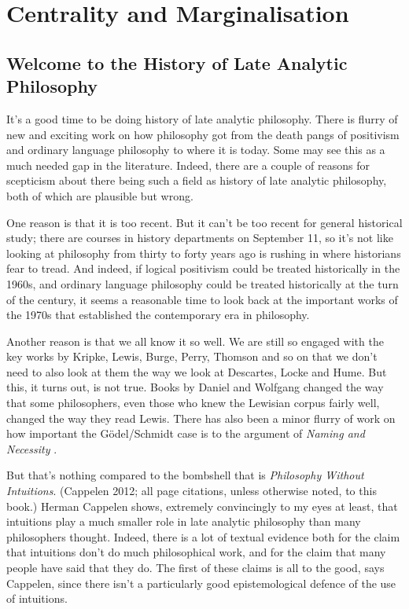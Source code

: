 \chapter[Centrality and Marginalisation]{Centrality and Marginalisation}
\section{Welcome to the History of Late Analytic Philosophy}
\label{sec:Intro}
It's a good time to be doing history of late analytic philosophy. There is flurry of new and exciting work on how philosophy got from the death pangs of positivism and ordinary language philosophy to where it is today. Some may see this as a much needed gap in the literature. Indeed, there are a couple of reasons for scepticism about there being such a field as history of late analytic philosophy, both of which are plausible but wrong.

One reason is that it is too recent. But it can't be too recent for general historical study; there are courses in history departments on September 11, so it's not like looking at philosophy from thirty to forty years ago is rushing in where historians fear to tread. And indeed, if logical positivism could be treated historically in the 1960s, and ordinary language philosophy could be treated historically at the turn of the century, it seems a reasonable time to look back at the important works of the 1970s that established the contemporary era in philosophy.

Another reason is that we all know it so well. We are still so engaged with the key works by Kripke, Lewis, Burge, Perry, Thomson and so on that we don't need to also look at them the way we look at Descartes, Locke and Hume. But this, it turns out, is not true. Books by Daniel \citet{Nolan2005} and Wolfgang \citet{Schwarz2009} changed the way that some philosophers, even those who knew the Lewisian corpus fairly well, changed the way they read Lewis. There has also been a minor flurry of work on how important the G\"odel/Schmidt case is to the argument of \textit{Naming and Necessity} \citep{Devitt2010, Ichikawa2010, Machery2012}.

But that's nothing compared to the bombshell that is \textit{Philosophy Without Intuitions}. (Cappelen 2012; all page citations, unless otherwise noted, to this book.) Herman Cappelen shows, extremely convincingly to my eyes at least, that intuitions play a much smaller role in late analytic philosophy than many philosophers thought. Indeed, there is a lot of textual evidence both for the claim that intuitions don't do much philosophical work, and for the claim that many people have said that they do. The first of these claims is all to the good, says Cappelen, since there isn't a particularly good epistemological defence of the use of intuitions. 

